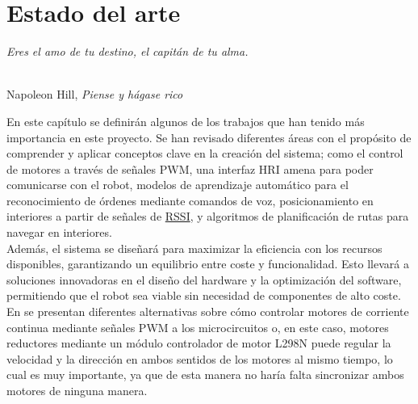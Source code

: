 \chapter{Estado del arte}
\label{cap:capitulo2}
\setcounter{page}{1}

\begin{flushright}
\begin{minipage}[]{10cm}
\emph{Eres el amo de tu destino, el capitán de tu alma.}\\
\end{minipage}\\

Napoleon Hill, \textit{Piense y hágase rico}\\
\end{flushright}

\vspace{1cm}



En este capítulo se definirán algunos de los trabajos que han tenido más importancia en este proyecto. Se han revisado diferentes áreas con el propósito de comprender y aplicar conceptos clave en la creación del sistema; como el control de motores a través de señales PWM, una interfaz HRI amena para poder comunicarse con el robot, modelos de aprendizaje automático para el reconocimiento de órdenes mediante comandos de voz, posicionamiento en interiores a partir de señales de \hyperlink{RSSI}{RSSI}, y algoritmos de planificación de rutas para navegar en interiores.\\

Además, el sistema se diseñará para maximizar la eficiencia con los recursos disponibles, garantizando un equilibrio entre coste y funcionalidad. Esto llevará a soluciones innovadoras en el diseño del hardware y la optimización del software, permitiendo que el robot sea viable sin necesidad de componentes de alto coste.\\

En \cite{9815716} se presentan diferentes alternativas sobre cómo controlar motores de corriente continua mediante señales PWM a los microcircuitos o, en este caso, motores reductores mediante un módulo controlador de motor L298N puede regular la velocidad y la dirección en ambos sentidos de los motores al mismo tiempo, lo cual es muy importante, ya que de esta manera no haría falta sincronizar ambos motores de ninguna manera.\\

